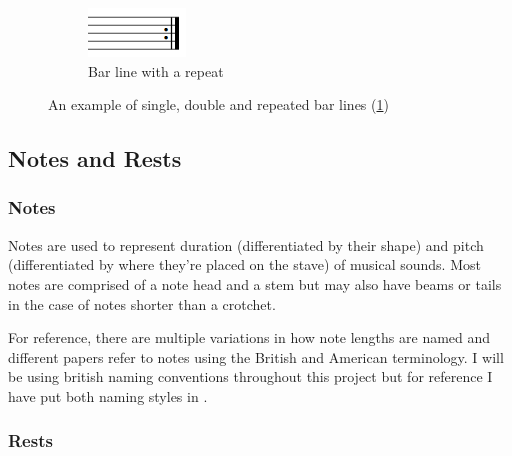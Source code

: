 \begin{figure}[H]
\begin{subfigure}[b]{.2\linewidth}
  \end{subfigure}
  \begin{subfigure}[b]{.2\linewidth}
      \centering
      \includegraphics[width=\linewidth]{gfx/music-theory/barline-end-repeat.png}
      \caption{Bar line with a repeat}
      \label{fig:repeat-bar-line}
  \end{subfigure}

  \caption{An example of single, double and repeated bar lines (\cref{fig:repeat-bar-line})}
  \label{fig:bar-line-types}
\end{figure}

\subsection{Notes and Rests}

\subsubsection{Notes}
\label{sec:music-theory-notes}
Notes are used to represent duration (differentiated by their shape) and pitch (differentiated by where they're placed on the stave) of musical sounds. Most notes are comprised of a note head and a stem but may also have beams or tails in the case of notes shorter than a crotchet.

For reference, there are multiple variations in how note lengths are named and different papers refer to notes using the British and American terminology. I will be using british naming conventions throughout this project but for reference I have put both naming styles in .

\subsubsection{Rests}
\label{sec:music-theory-rests}

